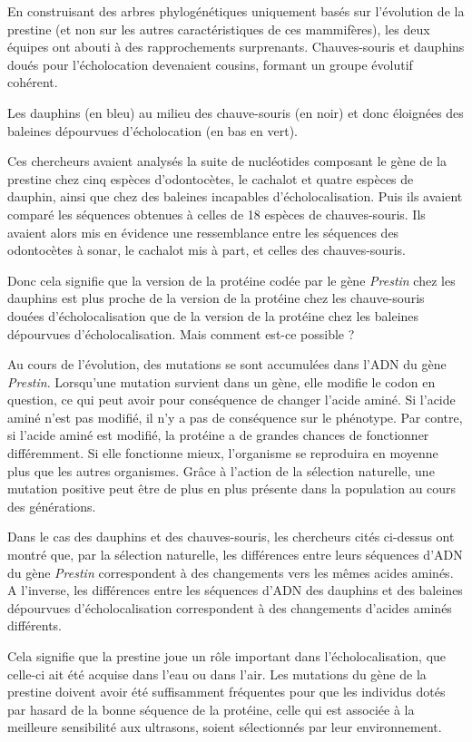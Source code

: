 En construisant des arbres phylogénétiques uniquement basés sur
l'évolution de la prestine (et non sur les autres caractéristiques de
ces mammifères), les deux équipes ont abouti à des rapprochements
surprenants. Chauves-souris et dauphins doués pour l'écholocation
devenaient cousins, formant un groupe évolutif cohérent.

Les dauphins (en bleu) au milieu des chauve-souris (en noir) et donc
éloignées des baleines dépourvues d'écholocation (en bas en vert).

Ces chercheurs avaient analysés la suite de nucléotides composant le
gène de la prestine chez cinq espèces d'odontocètes, le cachalot et
quatre espèces de dauphin, ainsi que chez des baleines incapables
d'écholocalisation. Puis ils avaient comparé les séquences obtenues à
celles de 18 espèces de chauves-souris. Ils avaient alors mis en
évidence une ressemblance entre les séquences des odontocètes à sonar,
le cachalot mis à part, et celles des chauves-souris.

Donc cela signifie que la version de la protéine codée par le gène
\emph{Prestin} chez les dauphins est plus proche de la version de la
protéine chez les chauve-souris douées d'écholocalisation que de la
version de la protéine chez les baleines dépourvues d'écholocalisation.
Mais comment est-ce possible ?

Au cours de l'évolution, des mutations se sont accumulées dans l'ADN du
gène \emph{Prestin}. Lorsqu'une mutation survient dans un gène, elle
modifie le codon en question, ce qui peut avoir pour conséquence de
changer l'acide aminé. Si l'acide aminé n'est pas modifié, il n'y a pas
de conséquence sur le phénotype. Par contre, si l'acide aminé est
modifié, la protéine a de grandes chances de fonctionner différemment.
Si elle fonctionne mieux, l'organisme se reproduira en moyenne plus que
les autres organismes. Grâce à l'action de la sélection naturelle, une
mutation positive peut être de plus en plus présente dans la population
au cours des générations.

Dans le cas des dauphins et des chauves-souris, les chercheurs cités
ci-dessus ont montré que, par la sélection naturelle, les différences
entre leurs séquences d'ADN du gène \emph{Prestin} correspondent à des
changements vers les mêmes acides aminés. A l'inverse, les différences
entre les séquences d'ADN des dauphins et des baleines dépourvues
d'écholocalisation correspondent à des changements d'acides aminés
différents.

Cela signifie que la prestine joue un rôle important dans
l'écholocalisation, que celle-ci ait été acquise dans l'eau ou dans
l'air. Les mutations du gène de la prestine doivent avoir été
suffisamment fréquentes pour que les individus dotés par hasard de la
bonne séquence de la protéine, celle qui est associée à la meilleure
sensibilité aux ultrasons, soient sélectionnés par leur environnement.

